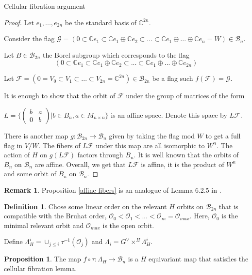 \documentclass[12pt]{article}
\newcommand{\B}{\mathcal{B}}
\newcommand{\C}{\mathbb{C}}
\newcommand{\s}{\mathcal{O}}
\newcommand{\<}{\langle}
\renewcommand{\>}{\rangle}
\theoremstyle{plain}
\theoremstyle{definition}
\newtheorem{prop}[theorem]{Proposition}
\newtheorem{Remark}[theorem]{Remark}
\newtheorem{defn}[theorem]{Definition}
\begin{document}
\begin{section}{Cellular fibration argument}
\begin{proof}
    
    Let $e_1,...,e_{2n}$ be the standard basis of $\C^{2n}$.
    
    Consider the flag $\mathcal{G}=(0\subset \C e_1\subset \C e_1\oplus \C e_2\subset ...\subset \C e_1\oplus... \oplus \C e_n=W)\in \B_n$.

    Let $B\in \B_{2n}$ the Borel subgroup which corresponds to the flag $$(0\subset \C e_1\subset \C e_1\oplus \C e_2\subset ...\subset \C e_1\oplus... \oplus \C e_{2n})$$
        
    Let $\mathcal{F}=(0=V_0\subset V_1\subset...\subset V_{2n}=\C^{2n})\in \B_{2n}$ be a flag such $f(\mathcal{F})=\mathcal{G}$.

    It is enough to show that the orbit of $\mathcal{F}$ under the group of matrices of the form
    
    $L=\{\begin{pmatrix}
        b & a \\
        0 & b
    \end{pmatrix}|b\in B_n,a\in M_{n\times n}\}$ is an affine space. Denote this space by $L\mathcal{F}$.

    There is another map $g:\B_{2n}\rightarrow \B_n$ given by taking the flag mod $W$ to get a full flag in $V/W$. The fibers of $L\mathcal{F}$ under this map are all isomorphic to $W^n$. The action of $H$ on $g(L\mathcal{F})$ factors through $B_n$. It is well known that the orbits of $B_n$ on $\B_n$ are affine. Overall, we get that $L\mathcal{F}$ is affine, it is the product of $W^n$ and some orbit of $B_n$ on $\B_n$. 
\end{proof}

\begin{Remark}
    Proposition \ref{affine fibers} is an analogue of Lemma 6.2.5 in \cite{Chriss1997RepresentationTA}. 
\end{Remark}

\begin{defn}
    Chose some linear order on the relevant $H$ orbits on $\B_{2n}$ that is compatible with the Bruhat order, $\s_0<\s_1<...<\s_m=\s_{max}$. Here, $\s_0$ is the minimal relevant orbit and $\s_{max}$ is the open orbit. 

     Define $\Lambda^i_H=\cup_{j\leq i} \tau^{-1}(\s_j)$ and $\Lambda_i=G^\vee\times^H \Lambda^i_H$.

\end{defn}



\begin{prop}
    The map $f\circ \tau:\Lambda_H\rightarrow \B_n$ is a $H$ equivariant map that satisfies the cellular fibration lemma.
\end{prop}


\end{section}
\end{document}
